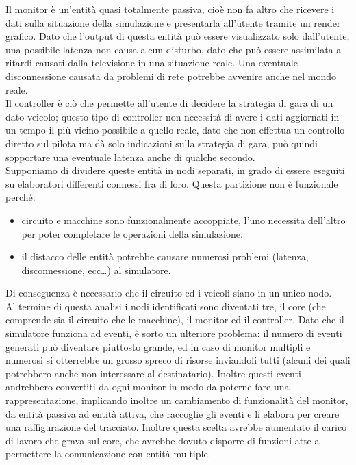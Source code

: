 Il monitor è un'entità quasi totalmente passiva, cioè non fa altro che ricevere i dati sulla situazione della simulazione e presentarla all’utente tramite un render grafico. Dato che l’output di questa entità può essere visualizzato solo dall’utente, una possibile latenza non causa alcun disturbo, dato che può essere assimilata a ritardi causati dalla televisione in una situazione reale. Una eventuale disconnessione causata da problemi di rete potrebbe avvenire anche nel mondo reale.
\\
Il controller è ciò che permette all’utente di decidere la strategia di gara di un dato veicolo; questo tipo di controller non necessità di avere i dati aggiornati in un tempo il più vicino possibile a quello reale, dato che non effettua un controllo diretto sul pilota ma dà solo indicazioni sulla strategia di gara, può quindi sopportare una eventuale latenza anche di qualche secondo. \\
Supponiamo di dividere queste entità in nodi separati, in grado di essere eseguiti su elaboratori differenti connessi fra di loro. 
Questa partizione non è funzionale perché:
\begin{itemize}
\item circuito e macchine sono funzionalmente accoppiate, l'uno necessita dell'altro per poter completare le operazioni della simulazione.
\item il distacco delle entità potrebbe causare numerosi problemi (latenza, disconnessione, ecc…) al simulatore. 
\end{itemize}
Di conseguenza è necessario che il circuito ed i veicoli siano in un unico nodo. \\
Al termine di questa analisi i nodi identificati sono diventati tre, il core (che comprende sia il circuito che le macchine), il monitor ed il controller.
Dato che il simulatore funziona ad eventi, è sorto un ulteriore problema: il numero di eventi generati può diventare piuttosto grande, ed in caso di monitor multipli e numerosi si otterrebbe un grosso spreco di risorse inviandoli tutti (alcuni dei quali potrebbero anche non interessare al destinatario). Inoltre questi eventi andrebbero convertiti da ogni monitor in modo da poterne fare una rappresentazione, implicando inoltre un cambiamento di funzionalità del monitor, da entità passiva ad entità attiva, che raccoglie gli eventi e li elabora per creare una raffigurazione del tracciato.
Inoltre questa scelta avrebbe aumentato il carico di lavoro che grava sul core,  che avrebbe dovuto disporre di funzioni atte a permettere la comunicazione con entità multiple.
